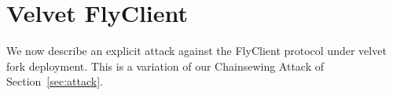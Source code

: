 \section{Velvet FlyClient}
\label{sec:flyclient}
We now describe an explicit attack against
the FlyClient protocol under velvet fork deployment.
This is a variation of our Chainsewing Attack of Section~\ref{sec:attack}.
%
